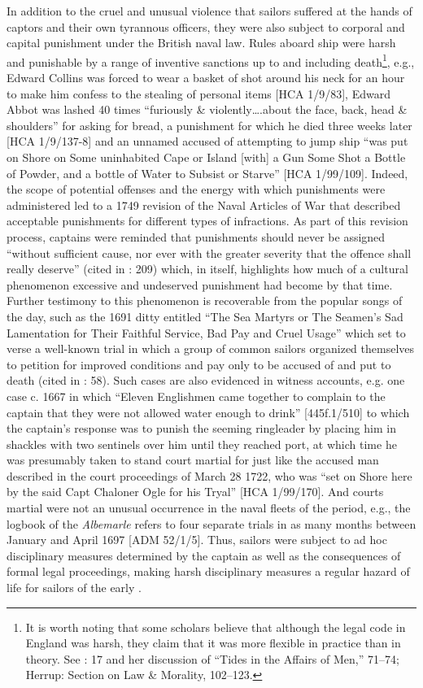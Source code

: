   In addition to the cruel and unusual violence that sailors suffered at the hands of captors and their own tyrannous officers, they were also subject to corporal and capital punishment under the British naval law. Rules aboard ship were harsh and punishable by a range of inventive sanctions up to and including death\footnote{It is worth noting that some scholars believe that although the legal code in England was harsh, they claim that it was more flexible in practice than in theory. See \citealt{Fury2015}: 17 and her discussion of “Tides in the Affairs of Men,” 71--74; Herrup: Section on Law \& Morality, 102--123.}, e.g., Edward Collins was forced to wear a basket of shot around his neck for an hour to make him confess to the stealing of personal items [HCA 1/9/83], Edward Abbot was lashed 40 times “furiously \& violently….about the face, back, head \& shoulders” for asking for bread, a punishment for which he died three weeks later [HCA 1/9/137-8] and an unnamed  accused of attempting to jump ship “was put on Shore on Some uninhabited Cape or Island [with] a Gun Some Shot a Bottle of Powder, and a bottle of Water to Subsist or Starve” [HCA 1/99/109]. Indeed, the scope of potential offenses and the energy with which punishments were administered led to a 1749 revision of the Naval Articles of War that described acceptable punishments for different types of infractions. As part of this revision process, captains were reminded that punishments should never be assigned “without sufficient cause, nor ever with the greater severity that the offence shall really deserve” (cited in \citealt{AdkinsAdkins2008}: 209) which, in itself, highlights how much of a cultural phenomenon excessive and undeserved punishment had become by that time. Further testimony to this phenomenon is recoverable from the popular songs of the day, such as the 1691 ditty entitled “The Sea Martyrs or The Seamen’s Sad Lamentation for Their Faithful Service, Bad Pay and Cruel Usage” which set to verse a well-known trial in which a group of common sailors organized themselves to petition for improved conditions and pay only to be accused of  and put to death (cited in \citealt{Palmer1986}: 58). Such cases are also evidenced in witness accounts, e.g. one case c. 1667 in which “Eleven Englishmen came together to complain to the captain that they were not allowed water enough to drink” [445f.1/510] to which the captain’s response was to punish the seeming ringleader by placing him in shackles with two sentinels over him until they reached port, at which time he was presumably taken to stand court martial for  just like the accused man described in the court proceedings of March 28 1722, who was “set on Shore here by the said Capt Chaloner Ogle for his Tryal” [HCA 1/99/170]. And courts martial were not an unusual occurrence in the naval fleets of the period, e.g., the logbook of the \textit{Albemarle} refers to four separate trials in as many months between  January and April 1697 [ADM 52/1/5]. Thus, sailors were subject to ad hoc disciplinary measures determined by the captain as well as the consequences of formal legal proceedings, making harsh disciplinary measures a regular hazard of life for sailors of the early .

